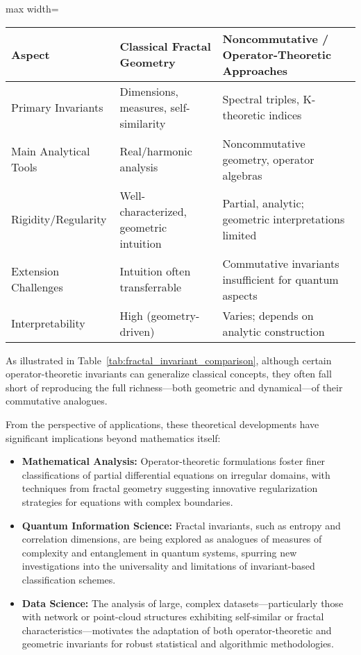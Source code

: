 \begin{table*}[htbp]
\centering
\caption{Comparison of Classical and Noncommutative Fractal Invariants}
\label{tab:fractal_invariant_comparison}
\begin{adjustbox}{max width=\textwidth}
\begin{tabular}{lll}
\toprule
\textbf{Aspect} & \textbf{Classical Fractal Geometry} & \textbf{Noncommutative / Operator-Theoretic Approaches} \\
\midrule
Primary Invariants & Dimensions, measures, self-similarity & Spectral triples, K-theoretic indices \\
Main Analytical Tools & Real/harmonic analysis & Noncommutative geometry, operator algebras \\
Rigidity/Regularity & Well-characterized, geometric intuition & Partial, analytic; geometric interpretations limited \\
Extension Challenges & Intuition often transferrable & Commutative invariants insufficient for quantum aspects \\
Interpretability & High (geometry-driven) & Varies; depends on analytic construction \\
\bottomrule
\end{tabular}
\end{adjustbox}
\end{table*}

As illustrated in Table~\ref{tab:fractal_invariant_comparison}, although certain operator-theoretic invariants can generalize classical concepts, they often fall short of reproducing the full richness—both geometric and dynamical—of their commutative analogues.

From the perspective of applications, these theoretical developments have significant implications beyond mathematics itself:

\begin{itemize}
    \item \textbf{Mathematical Analysis:} Operator-theoretic formulations foster finer classifications of partial differential equations on irregular domains, with techniques from fractal geometry suggesting innovative regularization strategies for equations with complex boundaries.
    \item \textbf{Quantum Information Science:} Fractal invariants, such as entropy and correlation dimensions, are being explored as analogues of measures of complexity and entanglement in quantum systems, spurring new investigations into the universality and limitations of invariant-based classification schemes.
    \item \textbf{Data Science:} The analysis of large, complex datasets—particularly those with network or point-cloud structures exhibiting self-similar or fractal characteristics—motivates the adaptation of both operator-theoretic and geometric invariants for robust statistical and algorithmic methodologies.
\end{itemize}

